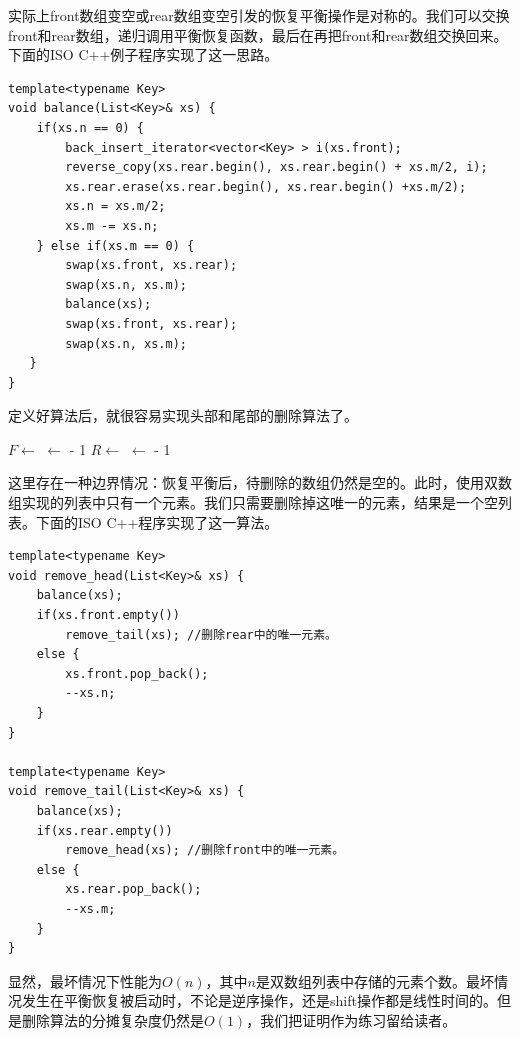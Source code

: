 \documentclass[b5paper]{ctexart}
\begin{document}
实际上front数组变空或rear数组变空引发的恢复平衡操作是对称的。我们可以交换front和rear数组，递归调用平衡恢复函数，最后在再把front和rear数组交换回来。下面的ISO C++例子程序实现了这一思路。

\begin{lstlisting}
template<typename Key>
void balance(List<Key>& xs) {
    if(xs.n == 0) {
        back_insert_iterator<vector<Key> > i(xs.front);
        reverse_copy(xs.rear.begin(), xs.rear.begin() + xs.m/2, i);
        xs.rear.erase(xs.rear.begin(), xs.rear.begin() +xs.m/2);
        xs.n = xs.m/2;
        xs.m -= xs.n;
    } else if(xs.m == 0) {
        swap(xs.front, xs.rear);
        swap(xs.n, xs.m);
        balance(xs);
        swap(xs.front, xs.rear);
        swap(xs.n, xs.m);
   }
}
\end{lstlisting}

定义好算法后，就很容易实现头部和尾部的删除算法了。

\begin{algorithmic}
  \State {}
  \State $F \gets $ 
    \State {}
  \Else
    \State {} $\gets $  - 1
  \EndIf
\EndFunction
\Statex
{}
  \State {}
  \State $R \gets $ 
    \State {}
  \Else
    \State {} $\gets $  - 1
  \EndIf
\EndFunction
\end{algorithmic}

这里存在一种边界情况：恢复平衡后，待删除的数组仍然是空的。此时，使用双数组实现的列表中只有一个元素。我们只需要删除掉这唯一的元素，结果是一个空列表。下面的ISO C++程序实现了这一算法。

\begin{lstlisting}
template<typename Key>
void remove_head(List<Key>& xs) {
    balance(xs);
    if(xs.front.empty())
        remove_tail(xs); //删除rear中的唯一元素。
    else {
        xs.front.pop_back();
        --xs.n;
    }
}

template<typename Key>
void remove_tail(List<Key>& xs) {
    balance(xs);
    if(xs.rear.empty())
        remove_head(xs); //删除front中的唯一元素。
    else {
        xs.rear.pop_back();
        --xs.m;
    }
}
\end{lstlisting}

显然，最坏情况下性能为$O(n)$，其中$n$是双数组列表中存储的元素个数。最坏情况发生在平衡恢复被启动时，不论是逆序操作，还是shift操作都是线性时间的。但是删除算法的分摊复杂度仍然是$O(1)$，我们把证明作为练习留给读者。
\end{document}
